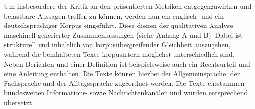 \noindent
Um insbesondere der Kritik an den präsentierten Metriken entgegenzuwirken und belastbare Aussagen treffen zu können, werden nun ein englisch- und ein deutschsprachiger Korpus eingeführt. Diese dienen der qualitativen Analyse maschinell generierter Zusammenfassungen (siehe Anhang A und B). Dabei ist strukturell und inhaltlich von korpusübergreifender Gleichheit auszugehen, während die beinhalteten Texte korpusintern möglichst unterschiedlich sind. Neben Berichten und einer Definition ist beispielsweise auch ein Rechtsurteil und eine Anleitung enthalten. Die Texte können hierbei der Allgemeinsprache, der Fachsprache und der Alltagssprache zugeordnet werden. Die Texte entstammen bundesweiten Informations- sowie Nachrichtenkanälen und wurden entsprechend übersetzt.
